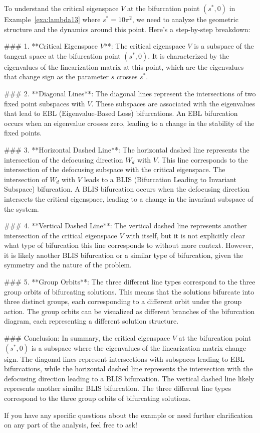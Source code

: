 To understand the critical eigenspace \( V \) at the bifurcation point \((s^*, 0)\) in Example~\ref{exa:lambda13} where \( s^* = 10\pi^2 \), we need to analyze the geometric structure and the dynamics around this point. Here's a step-by-step breakdown:

### 1. **Critical Eigenspace \( V \)**:
The critical eigenspace \( V \) is a subspace of the tangent space at the bifurcation point \((s^*, 0)\). It is characterized by the eigenvalues of the linearization matrix at this point, which are the eigenvalues that change sign as the parameter \( s \) crosses \( s^* \).

### 2. **Diagonal Lines**:
The diagonal lines represent the intersections of two fixed point subspaces with \( V \). These subspaces are associated with the eigenvalues that lead to EBL (Eigenvalue-Based Loss) bifurcations. An EBL bifurcation occurs when an eigenvalue crosses zero, leading to a change in the stability of the fixed points.

### 3. **Horizontal Dashed Line**:
The horizontal dashed line represents the intersection of the defocusing direction \( W_d \) with \( V \). This line corresponds to the intersection of the defocusing subspace with the critical eigenspace. The intersection of \( W_d \) with \( V \) leads to a BLIS (Bifurcation Leading to Invariant Subspace) bifurcation. A BLIS bifurcation occurs when the defocusing direction intersects the critical eigenspace, leading to a change in the invariant subspace of the system.

### 4. **Vertical Dashed Line**:
The vertical dashed line represents another intersection of the critical eigenspace \( V \) with itself, but it is not explicitly clear what type of bifurcation this line corresponds to without more context. However, it is likely another BLIS bifurcation or a similar type of bifurcation, given the symmetry and the nature of the problem.

### 5. **Group Orbits**:
The three different line types correspond to the three group orbits of bifurcating solutions. This means that the solutions bifurcate into three distinct groups, each corresponding to a different orbit under the group action. The group orbits can be visualized as different branches of the bifurcation diagram, each representing a different solution structure.

### Conclusion:
In summary, the critical eigenspace \( V \) at the bifurcation point \((s^*, 0)\) is a subspace where the eigenvalues of the linearization matrix change sign. The diagonal lines represent intersections with subspaces leading to EBL bifurcations, while the horizontal dashed line represents the intersection with the defocusing direction leading to a BLIS bifurcation. The vertical dashed line likely represents another similar BLIS bifurcation. The three different line types correspond to the three group orbits of bifurcating solutions.

If you have any specific questions about the example or need further clarification on any part of the analysis, feel free to ask!